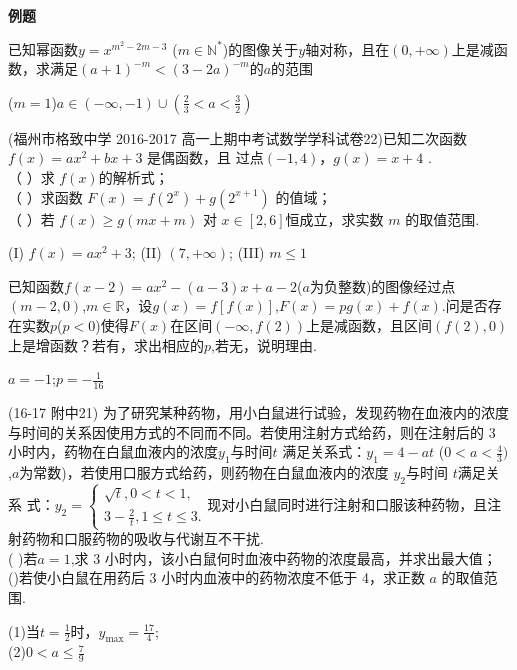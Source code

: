 \begin{exercise}{\large \bf 例\hspace{0.6em}题}
\item
已知幂函数$y=x^{m^2-2m-3} $ ($m\in \mathbb{N}^* $)的图像关于$y$轴对称，且在$(0,+\infty) $上是减函数，求满足$(a+1)^{-m}<(3-2a)^{-m} $的$a$的范围
\begin{answer}
($m=1$)$a\in (-\infty,-1)\cup(\frac23<a<\frac32)$
\end{answer}
\vspace{12em}


\item
(福州市格致中学 2016-2017 高一上期中考试数学学科试卷22)已知二次函数 $f ( x )= ax^2+ bx+3$ 是偶函数，且 过点$(-1,4)$，$ g ( x )= x + 4$ .\\
（ ）求 $f (x) $的解析式；\\
（ ）求函数 $F ( x )= f (2^x )+ g (2^{x+1} )$ 的值域； \\
（ ）若 $f ( x ) \geq g ( mx +m )$ 对 $x\in [2, 6] $恒成立，求实数 $m$ 的取值范围.\\
\begin{answer}
(I) $f(x)=ax^2+3$; (II) $(7,+\infty)$; (III) $m\leq1$
\end{answer}
\vspace{13em}


\item
已知函数$f(x-2)=ax^2-(a-3)x+a-2$($a$为负整数)的图像经过点 $(m-2,0) $,$m\in \mathbb{R}$，设$g(x)=f[f(x)] $,$F(x)=pg(x)+f(x)$.问是否存在实数$p$($p<0$)使得$F(x)$在区间$(-\infty,f(2)) $上是减函数，且区间$(f(2),0)$上是增函数？若有，求出相应的$p$,若无，说明理由.\\
\begin{answer}
$a=-1$;$p=-\frac{1}{16}$
\end{answer}
\vspace{15em}


\item
(16-17 附中21) 为了研究某种药物，用小白鼠进行试验，发现药物在血液内的浓度与时间的关系因使用方式的不同而不同。若使用注射方式给药，则在注射后的 3 小时内，药物在白鼠血液内的浓度$y_1$与时间$t$ 满足关系式：$y_1 =4-at$ ($0<a<\frac{4}{3})$,$a$为常数)，若使用口服方式给药，则药物在白鼠血液内的浓度 $y_2$与时间 $t$满足关系 式：$y_2=\begin{cases}\sqrt{t},0<t<1,\\3-\frac{2}{t},1\leq t\leq3.\end{cases}$现对小白鼠同时进行注射和口服该种药物，且注射药物和口服药物的吸收与代谢互不干扰.\\
( )若$a=1$,求 3 小时内，该小白鼠何时血液中药物的浓度最高，并求出最大值；\\
()若使小白鼠在用药后 3 小时内血液中的药物浓度不低于 4，求正数 $a$ 的取值范围.\\
\begin{answer}
(1)当$t=\frac12$时，$y_{\max}=\frac{17}{4}$;\\
(2)$0<a\leq\frac{7}{9}$
\end{answer}
\vspace{20em}


\end{exercise}
